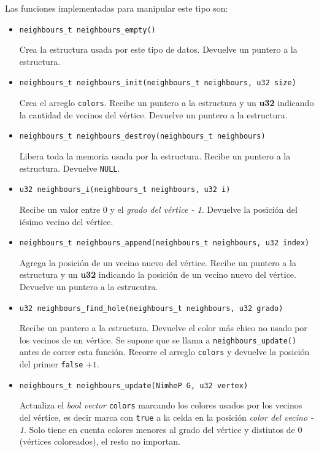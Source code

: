 \documentclass[11pt]{article}   	%
\begin{document}
Las funciones implementadas para manipular este tipo son:
\begin{itemize}
\item \texttt{neighbours\_t neighbours\_empty()}

Crea la estructura usada por este tipo de datos. Devuelve un puntero a la estructura.

\item \texttt{neighbours\_t neighbours\_init(neighbours\_t neighbours, u32 size)}

Crea el arreglo \texttt{colors}. 
Recibe un puntero a la estructura y un \textbf{u32} indicando la cantidad de vecinos del vértice. Devuelve
un puntero a la estructura.

\item \texttt{neighbours\_t neighbours\_destroy(neighbours\_t neighbours)}

Libera toda la memoria usada por la estructura. Recibe un puntero a la estructura. Devuelve \texttt{NULL}.

\item \texttt{u32 neighbours\_i(neighbours\_t neighbours, u32 i)}

Recibe un valor entre 0 y el \emph{grado del vértice - 1}. Devuelve la posición del
iésimo vecino del vértice.

\item \texttt{neighbours\_t neighbours\_append(neighbours\_t neighbours, u32 index)}

Agrega la posición de un vecino nuevo del vértice. 
Recibe un puntero a la estructura y un \textbf{u32} indicando la posición de un vecino nuevo del vértice.
Devuelve un puntero a la estrucutra.

\item \texttt{u32 neighbours\_find\_hole(neighbours\_t neighbours, u32 grado)}

Recibe un puntero a la estructura. Devuelve el color más chico no usado por los vecinos de un vértice. Se supone
que se llama a \texttt{neighbours\_update()} antes de correr esta función.
Recorre el arreglo \texttt{colors} y devuelve la posición del primer
\texttt{false} $+1$.

\item \texttt{neighbours\_t neighbours\_update(NimheP G, u32 vertex)}

Actualiza el \emph{bool vector} \texttt{colors} marcando los colores usados por
los vecinos del vértice, es decir marca con \texttt{true} a la celda en la
posición \emph{color del vecino - 1}. Solo tiene en cuenta colores menores al
grado del vértice y distintos de 0 (vértices coloreados), el resto no importan.
\end{itemize}
\clearpage
\end{document}
